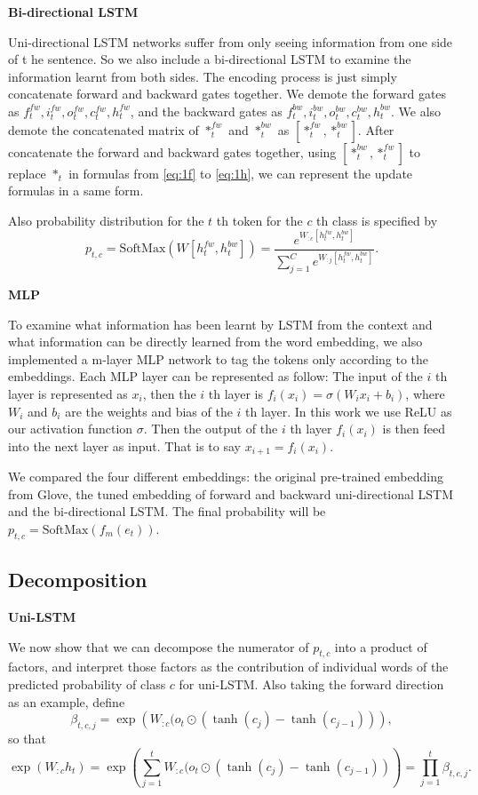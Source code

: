\documentclass{article}
\begin{document}
\textbf{Bi-directional LSTM}

Uni-directional LSTM networks suffer from only seeing information from one side of t he sentence. So we also include a bi-directional LSTM to examine the information learnt from both sides. The encoding process is just simply concatenate forward and backward gates together. We demote the forward gates as $f_t^{fw}, i_t^{fw}, o_t^{fw}, c_t^{fw}, h_t^{fw}$, and the backward gates as $f_t^{bw}, i_t^{bw}, o_t^{bw}, c_t^{bw}, h_t^{bw}$. We also demote the concatenated matrix of $*_t^{fw}$ and $*_t^{bw}$ as $[*_t^{fw}, *_t^{bw}]$. After concatenate the forward and backward gates together, using $[*_t^{bw}, *_t^{fw}]$ to replace $*_t$ in formulas from \ref{eq:1f} to \ref{eq:1h}, we can represent the update formulas in a same form. 

Also probability distribution for the $t$ th token for the $c$ th class is specified by 
\begin{equation}
p_{t, c} = \text{SoftMax}(W [h_t^{fw}, h_t^{bw}]) = \frac{e^{W_{:c} [h_t^{fw}, h_t^{bw}]}}{\sum_{j = 1} ^ C e^{W_{:j} [h_t^{fw}, h_t^{bw}]}}.
\end{equation}


\textbf{MLP}

To examine what information has been learnt by LSTM from the context and what information can be directly learned from the word embedding, we also implemented a m-layer MLP network to tag the tokens only according to the embeddings. Each MLP layer can be represented as follow:
The input of the $i$ th layer is represented as $x_i$, then the $i$ th layer is $f_i(x_i) = \sigma(W_i x_i + b_i)$, where $W_i$ and $b_i$ are the weights and bias of the $i$ th layer. In this work we use ReLU as our activation function $\sigma$. Then the output of the $i$ th layer $f_i(x_i)$ is then feed into the next layer as input. That is to say $x_{i+1} = f_i(x_i)$. 

We compared the four different embeddings: the original pre-trained embedding from Glove, the tuned embedding of forward and backward uni-directional LSTM and the bi-directional LSTM. The final probability will be $p_{t, c} = \text{SoftMax}(f_m(e_t))$.%

\subsection{Decomposition}

\textbf{Uni-LSTM}

We now show that we can decompose the numerator of $p_{t, c}$ into a product of factors, and interpret those factors as the contribution of individual words of the predicted probability of class $c$ for uni-LSTM. Also taking the forward direction as an example, define 
\begin{equation}\label{eq:uni-beta} 
\beta_{t, c, j} = \exp\left(W_{:c} (o_t \odot (\tanh(c_j)- \tanh(c_{j-1}))\right),
\end{equation}
so that 
\[\exp( W_{:c} h_t) = \exp\left(\sum_{j=1}^t W_{:c} (o_t \odot (\tanh(c_j) - \tanh(c_{j-1}))\right) = \prod_{j=1}^t \beta_{t, c, j}.\]
\end{document}
